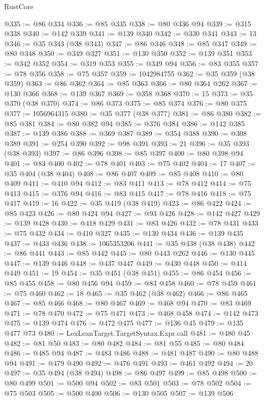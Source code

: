 \begin{lexlean}{RustCore}
\begin{coremodule}
@335 := @86 @334
@336 := @85 @335
@338 := @80 @336 @94
@339 := @315 @338
@340 := @142 @339
@341 := @139 @340
@342 := @330 @341
@343 := 13
@346 := @35 @343 (@38 @343)
@347 := @86 @346
@348 := @85 @347
@349 := @80 @348
@350 := @349 @327
@351 := @130 @350
@352 := @139 @351
@353 := @342 @352
@354 := @319 @353
@355 := @349 @94
@356 := @83 @355
@357 := @78 @356
@358 := @75 @357
@359 := 1042984755
@362 := @35 @359 (@38 @359)
@363 := @86 @362
@364 := @85 @363
@366 := @80 @364 @262
@367 := @130 @366
@368 := @139 @367
@369 := @358 @368
@370 := 15
@373 := @35 @370 (@38 @370)
@374 := @86 @373
@375 := @85 @374
@376 := @80 @375
@377 := 1056964315
@380 := @35 @377 (@38 @377)
@381 := @86 @380
@382 := @85 @381
@384 := @80 @382 @94
@385 := @376 @384
@386 := @142 @385
@387 := @139 @386
@388 := @369 @387
@389 := @354 @388
@390 := @308 @389
@391 := @254 @390
@392 := @98 @391
@393 := 21
@396 := @35 @393 (@38 @393)
@397 := @86 @396
@398 := @85 @397
@400 := @80 @398 @94
@401 := @83 @400
@402 := @78 @401
@403 := @75 @402
@404 := 17
@407 := @35 @404 (@38 @404)
@408 := @86 @407
@409 := @85 @408
@410 := @80 @409
@411 := @410 @94
@412 := @83 @411
@413 := @78 @412
@414 := @75 @413
@415 := @376 @94
@416 := @83 @415
@417 := @78 @416
@418 := @75 @417
@419 := 16
@422 := @35 @419 (@38 @419)
@423 := @86 @422
@424 := @85 @423
@426 := @80 @424 @94
@427 := @93 @426
@428 := @142 @427
@429 := @139 @428
@430 := @418 @429
@431 := @83 @426
@432 := @78 @431
@433 := @75 @432
@434 := @410 @327
@435 := @130 @434
@436 := @139 @435
@437 := @433 @436
@438 := 1065353206
@441 := @35 @438 (@38 @438)
@442 := @86 @441
@443 := @85 @442
@445 := @80 @443 @262
@446 := @130 @445
@447 := @139 @446
@448 := @437 @447
@449 := @430 @448
@450 := @414 @449
@451 := 19
@454 := @35 @451 (@38 @451)
@455 := @86 @454
@456 := @85 @455
@458 := @80 @456 @94
@459 := @83 @458
@460 := @78 @459
@461 := @75 @460
@462 := 18
@465 := @35 @462 (@38 @462)
@466 := @86 @465
@467 := @85 @466
@468 := @80 @467
@469 := @468 @94
@470 := @83 @469
@471 := @78 @470
@472 := @75 @471
@473 := @468 @458
@474 := @142 @473
@475 := @139 @474
@476 := @472 @475
@477 := @136 @45
@479 := @135 @477 @73
@480 := LexLeanTarget.TargetSyntax.Expr.call
@481 := @480 @45
@482 := @81 @50
@483 := @80 @482
@484 := @81 @55
@485 := @80 @484
@486 := @485 @94
@487 := @483 @486
@488 := @481 @487
@490 := @80 @488 @94
@491 := @479 @490
@492 := @476 @491
@493 := @461 @492
@494 := 20
@497 := @35 @494 (@38 @494)
@498 := @86 @497
@499 := @85 @498
@500 := @80 @499
@501 := @500 @94
@502 := @83 @501
@503 := @78 @502
@504 := @75 @503
@505 := @500 @400
@506 := @130 @505
@507 := @139 @506

\end{coremodule}
\end{lexlean}
